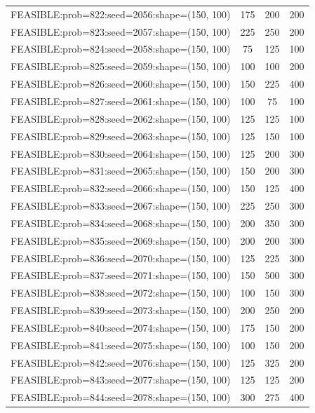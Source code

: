 \begin{longtable}{lccc}
FEASIBLE:prob=822:seed=2056:shape=(150, 100) &      175 &   200 &    200 \\
FEASIBLE:prob=823:seed=2057:shape=(150, 100) &      225 &   250 &    200 \\
FEASIBLE:prob=824:seed=2058:shape=(150, 100) &       75 &   125 &    100 \\
FEASIBLE:prob=825:seed=2059:shape=(150, 100) &      100 &   100 &    200 \\
FEASIBLE:prob=826:seed=2060:shape=(150, 100) &      150 &   225 &    400 \\
FEASIBLE:prob=827:seed=2061:shape=(150, 100) &      100 &    75 &    100 \\
FEASIBLE:prob=828:seed=2062:shape=(150, 100) &      125 &   125 &    100 \\
FEASIBLE:prob=829:seed=2063:shape=(150, 100) &      125 &   150 &    100 \\
FEASIBLE:prob=830:seed=2064:shape=(150, 100) &      125 &   200 &    300 \\
FEASIBLE:prob=831:seed=2065:shape=(150, 100) &      150 &   200 &    300 \\
FEASIBLE:prob=832:seed=2066:shape=(150, 100) &      150 &   125 &    400 \\
FEASIBLE:prob=833:seed=2067:shape=(150, 100) &      225 &   250 &    300 \\
FEASIBLE:prob=834:seed=2068:shape=(150, 100) &      200 &   350 &    300 \\
FEASIBLE:prob=835:seed=2069:shape=(150, 100) &      200 &   200 &    300 \\
FEASIBLE:prob=836:seed=2070:shape=(150, 100) &      125 &   225 &    300 \\
FEASIBLE:prob=837:seed=2071:shape=(150, 100) &      150 &   500 &    300 \\
FEASIBLE:prob=838:seed=2072:shape=(150, 100) &      100 &   150 &    300 \\
FEASIBLE:prob=839:seed=2073:shape=(150, 100) &      200 &   250 &    200 \\
FEASIBLE:prob=840:seed=2074:shape=(150, 100) &      175 &   150 &    200 \\
FEASIBLE:prob=841:seed=2075:shape=(150, 100) &      100 &   150 &    200 \\
FEASIBLE:prob=842:seed=2076:shape=(150, 100) &      125 &   325 &    200 \\
FEASIBLE:prob=843:seed=2077:shape=(150, 100) &      125 &   125 &    200 \\
FEASIBLE:prob=844:seed=2078:shape=(150, 100) &      300 &   275 &    400 \\

\end{longtable}
